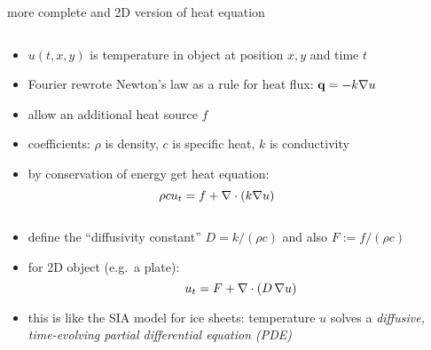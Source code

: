 \begin{frame}{more complete and 2D version of heat equation}

\small
\begin{columns}
\begin{column}{0.6\textwidth}
\begin{itemize}
\item $u(t,x,y)$ is temperature in object at position $x,y$ and time $t$
\item Fourier rewrote Newton's law as a rule for heat flux: $\mathbf{q} = - k \nabla u$
\item allow an additional heat source $f$
\item coefficients: $\rho$ is density, $c$ is specific heat, $k$ is conductivity
\item by conservation of energy get heat equation:
	$$\rho c u_t = f + \nabla\cdot (k \nabla u)$$
\end{itemize}
\end{column}
\begin{column}{0.4\textwidth}
\end{column}
\end{columns}

\begin{itemize}
\item define the ``diffusivity constant'' $D=k/(\rho c)$ and also $F := f/(\rho c)$
\item for 2D object (e.g.~a plate):
\begin{equation}
u_t = F + \nabla\cdot (D\, \nabla u) \label{heat}
\end{equation}
\item this is like the SIA model for ice sheets: temperature $u$ solves a \emph{diffusive, time-evolving partial differential equation (PDE)}
\end{itemize}
\end{frame}


